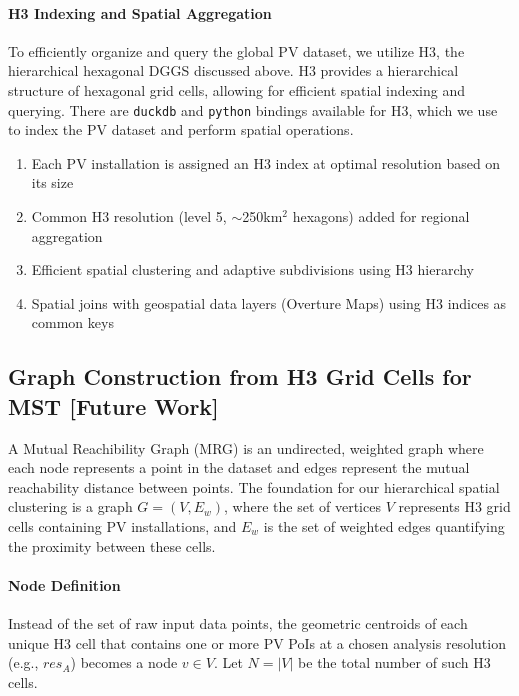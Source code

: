 \paragraph{H3 Indexing and Spatial Aggregation}
To efficiently organize and query the global PV dataset, we utilize H3, the hierarchical hexagonal DGGS discussed above.
H3 provides a hierarchical structure of hexagonal grid cells, allowing for efficient spatial indexing and querying. There are \texttt{duckdb} and \texttt{python} bindings available for H3,
which we use to index the PV dataset and perform spatial operations.
\begin{enumerate}
    \item Each PV installation is assigned an H3 index at optimal resolution based on its size
    \item Common H3 resolution (level 5, $\sim$250km$^2$ hexagons) added for regional aggregation
    \item Efficient spatial clustering and adaptive subdivisions using H3 hierarchy
    \item Spatial joins with geospatial data layers (Overture Maps) using H3 indices as common keys
\end{enumerate}

\subsection{Graph Construction from H3 Grid Cells for MST [Future Work]}

A Mutual Reachibility Graph (MRG) is an undirected, weighted graph where each node represents a point in the dataset and edges represent the mutual reachability distance between points.
The foundation for our hierarchical spatial clustering is a graph $G=(V, E_w)$, where the set of vertices $V$ represents H3 grid cells containing PV installations, and $E_w$ is the set of weighted edges quantifying the proximity between these cells.

\paragraph{Node Definition}
Instead of the set of raw input data points, the geometric centroids of each unique H3 cell that contains one or more PV PoIs at a chosen analysis resolution (e.g., $res_A$) becomes a node $v \in V$. Let $N = |V|$ be the total number of such H3 cells.

